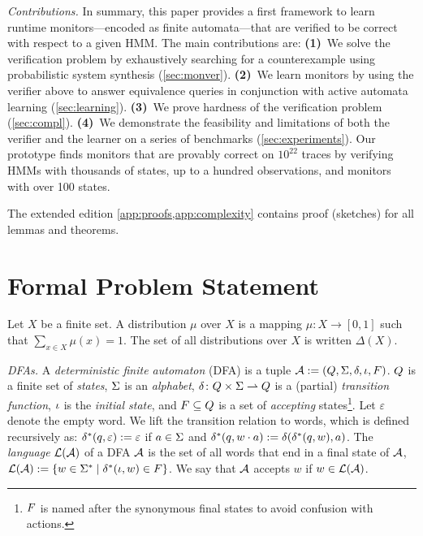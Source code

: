\documentclass[runningheads]{llncs}
\newcommand{\appcite}[2]{#2} %
\newcommand{\Distr}{\Delta}
\newcommand{\defeq}{:=}
\renewcommand{\paragraph}[1]{\smallskip\noindent\emph{#1}}
\begin{document}
\paragraph{Contributions.}
In summary, this paper provides a first framework to learn runtime monitors---encoded as finite automata---that are verified to be correct with respect to a given HMM. The main contributions are:
\textbf{(1)}~We solve the verification problem by exhaustively searching for a counterexample using probabilistic system synthesis (\cref{sec:monver}).
\textbf{(2)}~We learn monitors by using the verifier above to answer equivalence queries in conjunction with active automata learning (\cref{sec:learning}).
\textbf{(3)}~We prove hardness of the verification problem (\cref{sec:compl}).
\textbf{(4)}~We demonstrate the feasibility and limitations of both the verifier and the learner on a series of benchmarks (\cref{sec:experiments}). Our prototype finds monitors that are provably correct on $10^{22}$ traces by verifying HMMs with thousands of states, up to a hundred observations, and monitors with over 100 states.

\smallskip
\noindent
The extended edition \appcite{\cite[App. A and B]{TR}}{\cref{app:proofs,app:complexity}} contains proof (sketches) for all lemmas and theorems.

\section{Formal Problem Statement}
Let $X$ be a finite set. A distribution $\mu$ over $X$ is a mapping $\mu\colon X \rightarrow [0,1]$ such that $\sum_{x \in X} \mu(x) = 1$. The set of all distributions over $X$ is written $\Distr(X)$.


\paragraph{DFAs.}
A \emph{deterministic finite automaton} (DFA) is a tuple $\dfa\defeq\left(\StsD, \alphabet, \trans, \init, \final\right)$. $Q$ is a finite set of \emph{states}, $\Sigma$ is an \emph{alphabet}, $\delta\colon Q \times \Sigma \rightharpoonup Q$ is a (partial) \emph{transition function}, $\iota$ is the \emph{initial state}, and $F \subseteq Q$ is a set of \emph{accepting} states\footnote{$F$ is named after the synonymous final states to avoid confusion with actions.}.
Let $\varepsilon$ denote the empty word. We lift the transition relation to words, which is defined recursively as: $\trans^*(q, \varepsilon) \defeq \varepsilon$ if $a \in \Sigma$ and $\trans^*(q, w \cdot a) \defeq \trans(\trans^*(q,w), a)$. The \emph{language} $\mathcal{L}(\mathcal{A})$ of a DFA $\mathcal{A}$ is the set of all words that end in a final state of $\mathcal{A}$, $\lang{\dfa} \defeq \{ w \in \alphabet^* \mid \trans^*(\init, w) \in \final \}$. We say that $\mathcal{A}$ accepts $w$ if $w \in \mathcal{L}(\mathcal{A})$.
\end{document}
